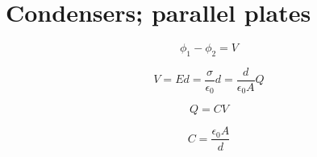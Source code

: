 \section{Condensers; parallel plates}

\begin{equation*}
  \phi_1 - \phi_2 = V
\end{equation*}

\begin{equation}
  V = Ed = \frac{\sigma}{\epsilon_0} d = \frac{d}{\epsilon_0 A} Q
\end{equation}

\begin{equation*}
  Q = CV
\end{equation*}

\begin{equation}
  C = \frac{\epsilon_0 A}{d}
\end{equation}

